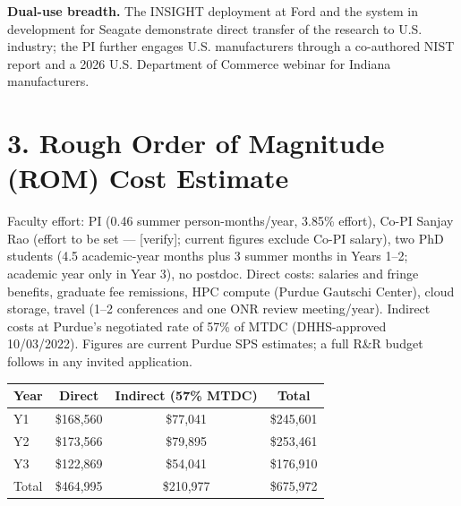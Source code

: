 \documentclass[12pt]{article}
\begin{document}
\textbf{Dual-use breadth.} The INSIGHT deployment at Ford and the system in development for Seagate demonstrate direct transfer of the research to U.S. industry; the PI further engages U.S. manufacturers through a co-authored NIST report and a 2026 U.S. Department of Commerce webinar for Indiana manufacturers.

\section*{3. Rough Order of Magnitude (ROM) Cost Estimate}

Faculty effort: PI (0.46 summer person-months/year, 3.85\% effort), Co-PI Sanjay Rao (effort to be set --- [verify]; current figures exclude Co-PI salary), two PhD students (4.5 academic-year months plus 3 summer months in Years 1–2; academic year only in Year 3), no postdoc. Direct costs: salaries and fringe benefits, graduate fee remissions, HPC compute (Purdue Gautschi Center), cloud storage, travel (1–2 conferences and one ONR review meeting/year). Indirect costs at Purdue's negotiated rate of 57\% of MTDC (DHHS-approved 10/03/2022). Figures are current Purdue SPS estimates; a full R\&R budget follows in any invited application.

\begin{center} \footnotesize \begin{tabular}{lccc} \hline Year & Direct & Indirect (57\% MTDC) & Total \\
\hline
Y1 & \$168,560 & \$77,041 & \$245,601 \\
Y2 & \$173,566 & \$79,895 & \$253,461 \\
Y3 & \$122,869 & \$54,041 & \$176,910 \\
Total & \$464,995 & \$210,977 & \$675,972 \\
\hline \end{tabular} \end{center}
\end{document}
